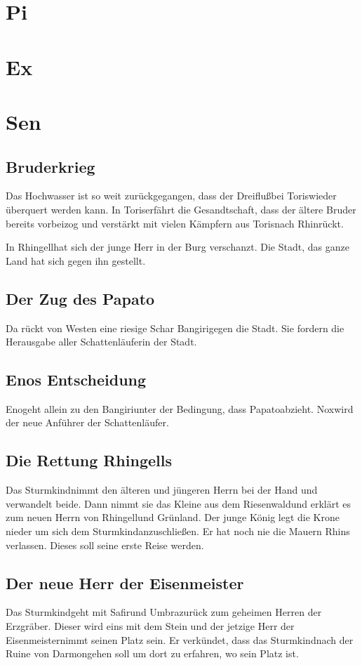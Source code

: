 \documentclass[12pt,a4paper,onecolumn,twoside,ngerman]{book}
\newcommand{\Sturmkind}{Sturmkind}
\newcommand{\Bangiri}{Bangiri}
\newcommand{\Papato}{Papato}
\newcommand{\Schattenjager}{Schattenläufer}
\newcommand{\Eno}{Eno}
\newcommand{\Nox}{Nox}
\newcommand{\Umbra}{Umbra}
\newcommand{\Rhingell}{Rhingell}
\newcommand{\Rhin}{Rhin}
\newcommand{\Dreifluss}{Dreifluß}
\newcommand{\Toris}{Toris}
\newcommand{\Grunland}{Grünland}
\newcommand{\Darmon}{Darmon}
\newcommand{\Riesenwald}{Riesenwald}
\newcommand{\Eisenmeister}{Eisenmeister}
\newcommand{\Safir}{Safir}
\begin{document}
\chapter{Pi}

\chapter{Ex}

\chapter{Sen}
\section{Bruderkrieg}
Das Hochwasser ist so weit zurückgegangen, dass der \Dreifluss bei \Toris wieder überquert werden kann. In \Toris erfährt die Gesandtschaft, dass der ältere Bruder bereits vorbeizog und verstärkt mit vielen Kämpfern aus \Toris nach \Rhin rückt. 

In \Rhingell hat sich der junge Herr in der Burg verschanzt. Die Stadt, das ganze Land hat sich gegen ihn gestellt. 

\section{Der Zug des \Papato}
Da rückt von Westen eine riesige Schar \Bangiri gegen die Stadt. Sie fordern die Herausgabe aller \Schattenjager in der Stadt.

\section{{\Eno}s Entscheidung}
\Eno geht allein zu den \Bangiri unter der Bedingung, dass \Papato abzieht. \Nox wird der neue Anführer der Schattenläufer.

\section{Die Rettung \Rhingell{s}}
Das \Sturmkind nimmt den älteren und jüngeren Herrn bei der Hand und verwandelt beide. Dann nimmt sie das Kleine aus dem \Riesenwald und erklärt es zum neuen Herrn von \Rhingell und \Grunland. Der junge König legt die Krone nieder um sich dem \Sturmkind anzuschließen. Er hat noch nie die Mauern \Rhin{s} verlassen. Dieses soll seine erste Reise werden.

\section{Der neue Herr der \Eisenmeister}
Das \Sturmkind geht mit \Safir und \Umbra zurück zum geheimen Herren der Erzgräber. Dieser wird eins mit dem Stein und der jetzige Herr der \Eisenmeister nimmt seinen Platz sein. Er verkündet, dass das \Sturmkind nach der Ruine von \Darmon gehen soll um dort zu erfahren, wo sein Platz ist.
\end{document}

